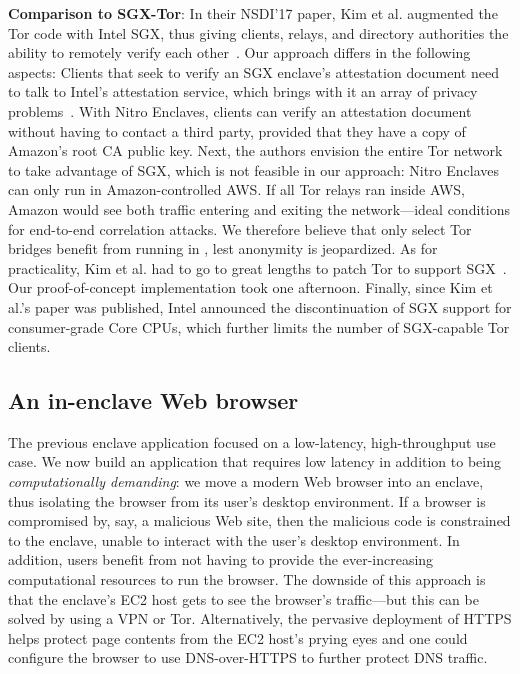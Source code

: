 \textbf{Comparison to SGX-Tor}: In their NSDI'17 paper, Kim et al. augmented the
Tor code with Intel SGX, thus giving clients, relays, and directory authorities
the ability to remotely verify each other~\cite{Kim2017a}.  Our approach differs
in the following aspects:
%
Clients that seek to verify an SGX enclave's attestation document need to talk
to Intel's attestation service, which brings with it an array of privacy
problems~\cite[\S~1.2]{Chen2019a}.  With Nitro Enclaves, clients can verify an
attestation document without having to contact a third party, provided that they
have a copy of Amazon's root CA public key.
Next, the authors envision the entire Tor network to take advantage of SGX,
which is not feasible in our approach: Nitro Enclaves can only run in
Amazon-controlled AWS.  If all Tor relays ran inside AWS, Amazon would see both
traffic entering and exiting the network---ideal conditions for end-to-end
correlation attacks.  We therefore believe that only select Tor bridges benefit
from running in \tool{}, lest anonymity is jeopardized.
As for practicality, Kim et al. had to go to great lengths to patch Tor to
support SGX~\cite[\S~5]{Kim2017a}.  Our proof-of-concept implementation took one
afternoon.  Finally, since Kim et al.'s paper was published, Intel announced the
discontinuation of SGX support for consumer-grade Core CPUs, which further
limits the number of SGX-capable Tor clients.

\subsection{An in-enclave Web browser}%
\label{sec:browser}

The previous enclave application focused on a low-latency, high-throughput use
case.  We now build an application that requires low latency in addition to
being \emph{computationally demanding}: we move a modern Web browser into an
enclave, thus isolating the browser from its user's desktop environment.
If a browser is compromised by, say, a malicious Web site, then the malicious
code is constrained to the enclave, unable to interact with the user's desktop
environment.  In addition, users benefit from not having to provide the
ever-increasing computational resources to run the browser.
The downside of this approach is that the enclave's EC2 host gets to see the
browser's traffic---but this can be solved by using a VPN or Tor.
Alternatively, the pervasive deployment of HTTPS helps protect page contents
from the EC2 host's prying eyes and one could configure the browser to use
DNS-over-HTTPS to further protect DNS traffic.


